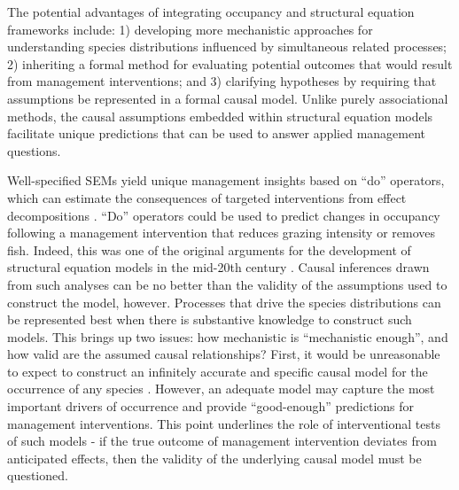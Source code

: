 The potential advantages of integrating occupancy and structural
equation frameworks include: 1) developing more mechanistic approaches
for understanding species distributions influenced by simultaneous
related processes; 2) inheriting a formal method for evaluating
potential outcomes that would result from management interventions; and
3) clarifying hypotheses by requiring that assumptions be represented in
a formal causal model. Unlike purely associational methods, the causal
assumptions embedded within structural equation models facilitate unique
predictions that can be used to answer applied management questions.

Well-specified SEMs yield unique management insights based on ``do''
operators, which can estimate the consequences of targeted interventions
from effect decompositions \citep{PEARL1998}. ``Do'' operators could be used
to predict changes in occupancy following a management intervention that
reduces grazing intensity or removes fish. Indeed, this was one of the
original arguments for the development of structural equation models in
the mid-20th century \citep{shipley2002cause}. Causal inferences
drawn from such analyses can be no better than the validity of the
assumptions used to construct the model, however. Processes that drive
the species distributions can be represented best when there is
substantive knowledge to construct such models. This brings up two
issues: how mechanistic is ``mechanistic enough'', and how valid are the
assumed causal relationships? First, it would be unreasonable to expect
to construct an infinitely accurate and specific causal model for the
occurrence of any species \citep{shipley2002cause}. However, an adequate model may
capture the most important drivers of occurrence and provide
``good-enough'' predictions for management interventions. This point
underlines the role of interventional tests of such models - if the true
outcome of management intervention deviates from anticipated effects,
then the validity of the underlying causal model must be questioned.

